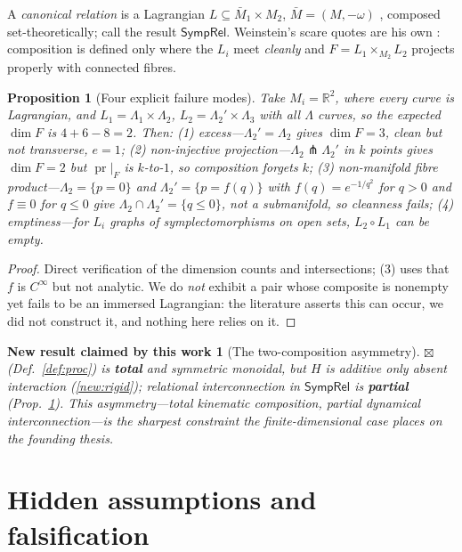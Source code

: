 \documentclass[12pt,a4paper]{article}
\theoremstyle{definition}
\theoremstyle{plain}
\newtheorem{proposition}[definition]{Proposition}
\theoremstyle{commentary}
\newtheorem{newresult}[definition]{New result claimed by this work}
\newcommand{\R}{\mathbb{R}}
\newcommand{\Cinf}{C^{\infty}}
\newcommand{\SympRel}{\mathsf{SympRel}}
\begin{document}
\noindent A \emph{canonical relation} is a Lagrangian $L\subseteq\bar M_1\times M_2$,
$\bar M=(M,-\omega)$ \cite{Weinstein1971}, composed set-theoretically; call the result $\SympRel$.
Weinstein's scare quotes are his own \cite{Weinstein1982}: composition is defined only where the
$L_i$ meet \emph{cleanly} and $F=L_1\times_{M_2}L_2$ projects properly with connected fibres.

\begin{proposition}[Four explicit failure modes]\label{prop:fourfail}
Take $M_i=\R^2$, where every curve is Lagrangian, and $L_1=\Lambda_1\times\Lambda_2$,
$L_2=\Lambda_2'\times\Lambda_3$ with all $\Lambda$ curves, so the expected $\dim F$ is $4+6-8=2$.
Then: (1) \emph{excess}---$\Lambda_2'=\Lambda_2$
gives $\dim F=3$, clean but not transverse, $e=1$; (2) \emph{non-injective
projection}---$\Lambda_2\pitchfork\Lambda_2'$ in $k$ points gives $\dim F=2$ but
$\operatorname{pr}|_F$ is $k$-to-$1$, so composition forgets $k$; (3) \emph{non-manifold fibre
product}---$\Lambda_2=\{p=0\}$ and $\Lambda_2'=\{p=f(q)\}$ with $f(q)=e^{-1/q^2}$ for $q>0$ and
$f\equiv0$ for $q\le0$ give $\Lambda_2\cap\Lambda_2'=\{q\le0\}$, not a submanifold, so cleanness
fails; (4) \emph{emptiness}---for $L_i$ graphs of symplectomorphisms on open
sets, $L_2\circ L_1$ can be empty.
\end{proposition}
\begin{proof}
Direct verification of the dimension counts and intersections; (3) uses that $f$ is $\Cinf$ but not
analytic. We do \emph{not} exhibit a pair whose composite is nonempty yet fails to be an immersed
Lagrangian: the literature asserts this can occur, we did not construct it, and nothing here relies
on it.
\end{proof}

\begin{newresult}[The two-composition asymmetry]\label{new:twocomp}
$\boxtimes$ (Def.~\ref{def:proc}) is \textbf{total} and symmetric monoidal, but $H$ is additive only
absent interaction (\ref{new:rigid}); relational interconnection in $\SympRel$ is \textbf{partial}
(Prop.~\ref{prop:fourfail}). This asymmetry---total kinematic composition, partial dynamical
interconnection---is the sharpest constraint the finite-dimensional case places on the founding
thesis.
\end{newresult}

\section{Hidden assumptions and falsification}
\label{sec:falsify}
\end{document}
